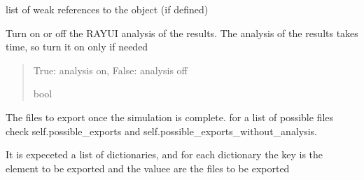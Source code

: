 \documentclass[letterpaper,10pt,english]{sphinxmanual}
\begin{document}
\begin{fulllineitems}
\begin{fulllineitems}
\end{fulllineitems}


\begin{fulllineitems}
\label{\detokenize{index:raypyng.simulate.Simulate.__weakref__}}
\pysigstartsignatures
{}
\pysigstopsignatures
\sphinxAtStartPar
list of weak references to the object (if defined)

\end{fulllineitems}


\begin{fulllineitems}
\label{\detokenize{index:raypyng.simulate.Simulate.analyze}}
\pysigstartsignatures
{}
\pysigstopsignatures
\sphinxAtStartPar
Turn on or off the RAY\sphinxhyphen{}UI analysis of the results.
The analysis of the results takes time, so turn it on only if needed
\begin{quote}\begin{description}
\sphinxAtStartPar
True: analysis on, False: analysis off

\sphinxAtStartPar
bool

\end{description}\end{quote}

\end{fulllineitems}


\begin{fulllineitems}
\label{\detokenize{index:raypyng.simulate.Simulate.exports}}
\pysigstartsignatures
{}
\pysigstopsignatures
\sphinxAtStartPar
The files to export once the simulation is complete.
for a list of possible files check self.possible\_exports
and self.possible\_exports\_without\_analysis.

\sphinxAtStartPar
It is expeceted a list of dictionaries, and for each dictionary the key is the element
to be exported and the valuee are the files to be exported


\end{fulllineitems}
\end{fulllineitems}
\end{document}
